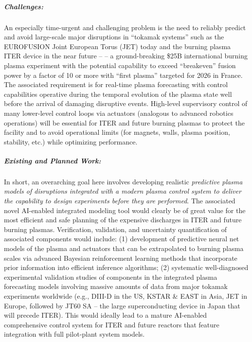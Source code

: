 \subparagraph*{Challenges:} An especially time-urgent and challenging problem is the need to reliably predict and avoid large-scale major disruptions in “tokamak systems” such as the EUROFUSION Joint European Torus (JET) today and the burning plasma ITER device in the near future -- -- a ground-breaking \$25B international burning plasma experiment with the potential capability to exceed “breakeven” fusion power by a factor of 10 or more with “first plasma” targeted for 2026 in France.  The associated requirement is for real-time plasma forecasting with control capabilities operative during the temporal evolution of the plasma state well before the arrival of damaging disruptive events.  High-level supervisory control of many lower-level control loops via actuators (analogous to advanced robotics operations) will be essential for ITER and future burning plasmas to protect the facility and to avoid operational limits (for magnets, walls, plasma position, stability, etc.) while optimizing performance.   

\subparagraph*{Existing and Planned Work:} In short, an overarching goal here involves developing realistic \textit{predictive plasma models of disruptions integrated with a modern plasma control system to deliver the capability to design experiments before they are performed}. The associated novel AI-enabled integrated modeling tool would clearly be of great value for the most efficient and safe planning of the expensive discharges in ITER and future burning plasmas. Verification, validation, and uncertainty quantification of associated components would include: (1) development of predictive neural net models of the plasma and actuators that can be extrapolated to burning plasma scales via advanced Bayesian reinforcement learning methods that incorporate prior information into efficient inference algorithms; (2) systematic well-diagnosed experimental validation studies of components in the integrated plasma forecasting models involving massive amounts of data from major tokamak experiments worldwide (e.g., DIII-D in the US, KSTAR \& EAST in Asia, JET in Europe, followed by JT60 SA – the large superconducting device in Japan that will precede ITER).  This would ideally lead to a mature AI-enabled comprehensive control system for ITER and future reactors that feature integration with full pilot-plant system models. 


